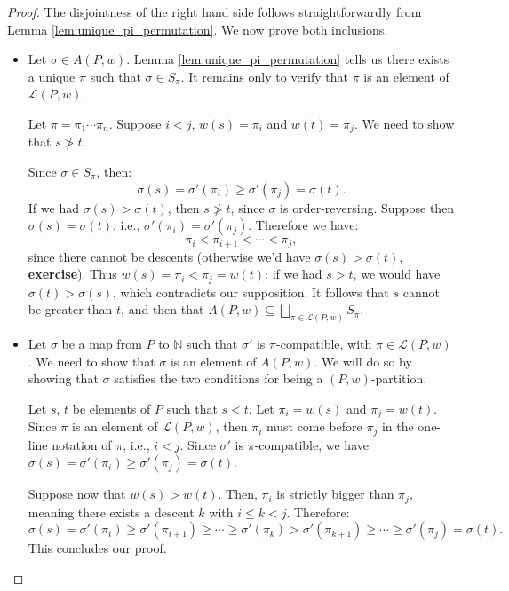 \documentclass[11pt]{amsart}
\theoremstyle{plain}
\theoremstyle{definition}
\theoremstyle{remark}
\newcommand{\LL}{\mathcal{L}}
\newcommand{\NN}{\mathbb{N}}
\numberwithin{equation}{section}
\begin{document}
\begin{proof}
	The disjointness of the right hand side follows straightforwardly from Lemma \ref{lem:unique_pi_permutation}.
	We now prove both inclusions.

	\begin{itemize}
		\item[($\subseteq$)] Let $\sigma \in A(P, w)$. Lemma \ref{lem:unique_pi_permutation} tells us there exists a unique
		      $\pi$ such that $\sigma \in S_\pi$. It remains only to verify that $\pi$ is an element of $\LL(P, w)$.

		      Let $\pi = \pi_1 \cdots \pi_n$. Suppose $i < j$, $w(s) = \pi_i$ and $w(t) = \pi_j$. We need to show that
		      $s \not> t$.

		      Since $\sigma \in S_\pi$, then:
		      \[ \sigma(s) = \sigma'(\pi_i) \geq \sigma'(\pi_j) = \sigma(t). \]
		      If we had $\sigma(s) > \sigma(t)$, then $s \not> t$, since $\sigma$ is order-reversing. Suppose then
		      $\sigma(s) = \sigma(t)$, i.e., $\sigma'(\pi_i) = \sigma'(\pi_j)$. Therefore we have:
		      \[
			      \pi_i < \pi_{i+1} < \cdots < \pi_j,
		      \]
		      since there cannot be descents (otherwise we'd have $\sigma(s) > \sigma(t)$, \textbf{exercise}). Thus
		      $w(s) = \pi_i < \pi_j = w(t)$: if we had $s > t$, we would have $\sigma(t) > \sigma(s)$, which contradicts
		      our supposition. It follows that $s$ cannot be greater than $t$, and then that $A(P, w) \subseteq \bigsqcup_{\pi \in \LL(P, w)} S_\pi$.

		\item[($\supseteq$)] Let $\sigma$ be a map from $P$ to $\NN$ such that $\sigma'$ is $\pi$-compatible, with $\pi \in \LL(P, w)$. We need to show
		      that $\sigma$ is an element of $A(P, w)$. We will do so by showing that $\sigma$ satisfies the two conditions for being a $(P, w)$-partition.

		      Let $s$, $t$ be elements of $P$ such that $s < t$. Let $\pi_i = w(s)$ and $\pi_j = w(t)$. Since
		      $\pi$ is an element of $\LL(P, w)$, then $\pi_i$ must come before $\pi_j$ in the one-line notation of $\pi$, i.e., $i < j$. Since $\sigma'$ is
		      $\pi$-compatible, we have $\sigma(s) = \sigma'(\pi_i) \geq \sigma'(\pi_j) = \sigma(t)$.

		      Suppose now that $w(s) > w(t)$. Then, $\pi_i$ is strictly bigger than $\pi_j$, meaning there exists a descent $k$ with $i \leq k < j$. Therefore:
		      \[
			      \sigma(s) = \sigma'(\pi_i) \geq \sigma'(\pi_{i+1}) \geq \cdots \geq \sigma'(\pi_k) > \sigma'(\pi_{k+1}) \geq \cdots \geq \sigma'(\pi_j) = \sigma(t).
		      \]
		      This concludes our proof.
	\end{itemize}
\end{proof}
\end{document}
